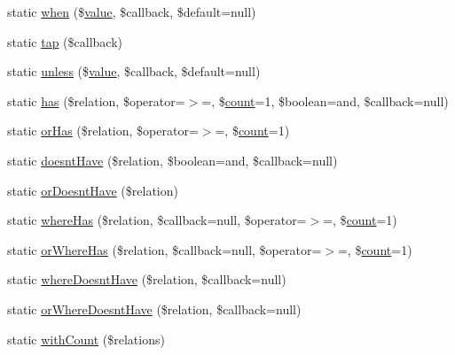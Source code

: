 \begin{DoxyCompactItemize}
\item 
static \mbox{\hyperlink{class_eloquent_a72b824dce01f0fa80a87803b42b46ad2}{when}} (\$\mbox{\hyperlink{class_eloquent_a653061eb837042f61e82447886e15a72}{value}}, \$callback, \$default=null)
\item 
static \mbox{\hyperlink{class_eloquent_a0dd65fb10e55398ea958ac8f9a400c5e}{tap}} (\$callback)
\item 
static \mbox{\hyperlink{class_eloquent_accafe93f07a9d607402021b0c2df2c6e}{unless}} (\$\mbox{\hyperlink{class_eloquent_a653061eb837042f61e82447886e15a72}{value}}, \$callback, \$default=null)
\item 
static \mbox{\hyperlink{class_eloquent_ab786bef6379c67769eee53bb950fd389}{has}} (\$relation, \$operator=\textquotesingle{}$>$=\textquotesingle{}, \$\mbox{\hyperlink{class_eloquent_af7f114e287681eb2333c97d6bf26285d}{count}}=1, \$boolean=\textquotesingle{}and\textquotesingle{}, \$callback=null)
\item 
static \mbox{\hyperlink{class_eloquent_ab69605000942044dafd16ce8701a8565}{or\+Has}} (\$relation, \$operator=\textquotesingle{}$>$=\textquotesingle{}, \$\mbox{\hyperlink{class_eloquent_af7f114e287681eb2333c97d6bf26285d}{count}}=1)
\item 
static \mbox{\hyperlink{class_eloquent_a0856f1bda42e0b3846becb4329bf214a}{doesnt\+Have}} (\$relation, \$boolean=\textquotesingle{}and\textquotesingle{}, \$callback=null)
\item 
static \mbox{\hyperlink{class_eloquent_a00b0d5adff6b69d4b8eb864d64656a97}{or\+Doesnt\+Have}} (\$relation)
\item 
static \mbox{\hyperlink{class_eloquent_a2aa796efce7c1d1140d409b67c06f51d}{where\+Has}} (\$relation, \$callback=null, \$operator=\textquotesingle{}$>$=\textquotesingle{}, \$\mbox{\hyperlink{class_eloquent_af7f114e287681eb2333c97d6bf26285d}{count}}=1)
\item 
static \mbox{\hyperlink{class_eloquent_ae47b5731c4d49fc51c418d1b9eda590e}{or\+Where\+Has}} (\$relation, \$callback=null, \$operator=\textquotesingle{}$>$=\textquotesingle{}, \$\mbox{\hyperlink{class_eloquent_af7f114e287681eb2333c97d6bf26285d}{count}}=1)
\item 
static \mbox{\hyperlink{class_eloquent_a71116973df1571c2a9d16aa656957557}{where\+Doesnt\+Have}} (\$relation, \$callback=null)
\item 
static \mbox{\hyperlink{class_eloquent_abe51aca19cc993e96f996fa60c1c25e6}{or\+Where\+Doesnt\+Have}} (\$relation, \$callback=null)
\item 
static \mbox{\hyperlink{class_eloquent_a42b7896267dd0cee14d24f21f48ffe71}{with\+Count}} (\$relations)

\end{DoxyCompactItemize}
